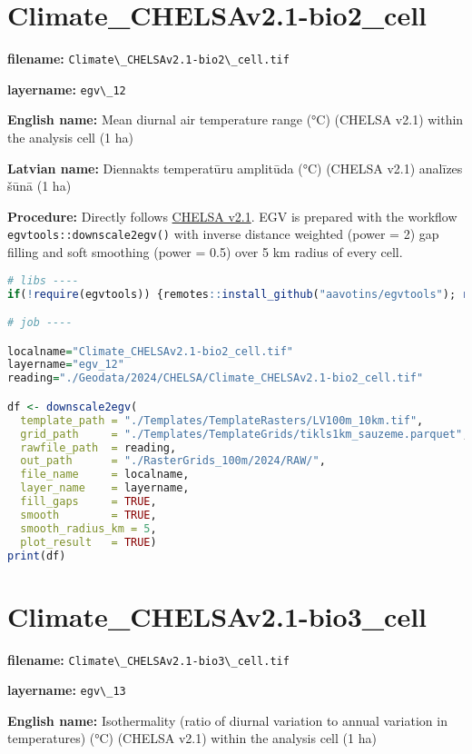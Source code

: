 \documentclass[
]{book}
\newcommand{\passthrough}[1]{#1}
\begin{document}
\section{Climate\_CHELSAv2.1-bio2\_cell}\label{ch06.012}

\textbf{filename:} \passthrough{\lstinline!Climate\_CHELSAv2.1-bio2\_cell.tif!}

\textbf{layername:} \passthrough{\lstinline!egv\_12!}

\textbf{English name:} Mean diurnal air temperature range (°C) (CHELSA v2.1) within the analysis cell (1 ha)

\textbf{Latvian name:} Diennakts temperatūru amplitūda (°C) (CHELSA v2.1) analīzes šūnā (1 ha)

\textbf{Procedure:} Directly follows \hyperref[Ch04.11]{CHELSA v2.1}. EGV is prepared with the
workflow \passthrough{\lstinline!egvtools::downscale2egv()!} with inverse distance weighted (power = 2)
gap filling and soft smoothing (power = 0.5) over 5 km radius of every cell.

\begin{lstlisting}[language=R]
# libs ----
if(!require(egvtools)) {remotes::install_github("aavotins/egvtools"); require(egvtools)}

# job ----

localname="Climate_CHELSAv2.1-bio2_cell.tif"
layername="egv_12"
reading="./Geodata/2024/CHELSA/Climate_CHELSAv2.1-bio2_cell.tif"

df <- downscale2egv(
  template_path = "./Templates/TemplateRasters/LV100m_10km.tif",
  grid_path     = "./Templates/TemplateGrids/tikls1km_sauzeme.parquet",
  rawfile_path  = reading,
  out_path      = "./RasterGrids_100m/2024/RAW/",
  file_name     = localname,
  layer_name    = layername,
  fill_gaps     = TRUE,
  smooth        = TRUE,
  smooth_radius_km = 5,
  plot_result   = TRUE)
print(df)
\end{lstlisting}

\section{Climate\_CHELSAv2.1-bio3\_cell}\label{ch06.013}

\textbf{filename:} \passthrough{\lstinline!Climate\_CHELSAv2.1-bio3\_cell.tif!}

\textbf{layername:} \passthrough{\lstinline!egv\_13!}

\textbf{English name:} Isothermality (ratio of diurnal variation to annual variation in temperatures) (°C) (CHELSA v2.1) within the analysis cell (1 ha)
\end{document}
